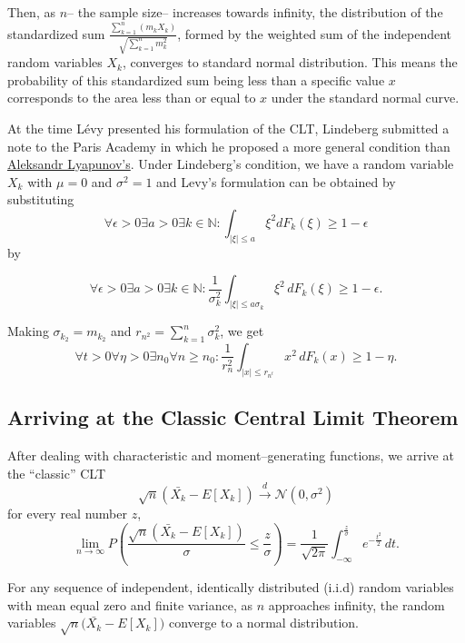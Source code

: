 \documentclass[11.5pt,article,oneside]{article}
\begin{document}
Then, as ${n}$– the sample size– increases towards infinity, the distribution of the standardized sum {\small {$\frac{\sum_{k=1}^{n} (m_k X_k)}{\sqrt{\sum_{k=1}^{n} m_k^{2}}}$}}, formed by the weighted sum of the independent random variables $X_{k}$, converges to standard normal distribution. This means the probability of this standardized sum being less than a specific value ${x}$ corresponds to the area less than or equal to ${x}$ under the standard normal curve.

At the time Lévy presented his formulation of the CLT, Lindeberg submitted a note to the Paris Academy in which he proposed a more general condition than \href{https://en.wikipedia.org/wiki/Aleksandr_Lyapunov}{Aleksandr Lyapunov's}. Under Lindeberg's condition, we have a random variable $X_{k}$ with $\mu = 0$ and $\sigma^{2}= 1$ and Levy's formulation can be obtained by substituting 
\small \[\forall{\epsilon} > {0}\exists{a} > {0}\exists{k} \in {\mathbb{N}: \int_{|\xi| \leq {a}}} \xi^{2}{dF_k(\xi) \geq 1 - \epsilon}
\]
by

\[\forall \epsilon > 0\exists a > 0\exists k \in \mathbb{N}: \frac{1}{\sigma_k^2} \int_{|\xi| \leq a\sigma_{k}} \xi^{2} \, dF_k(\xi) \geq 1 - \epsilon.\] \vspace{.3em}

\noindent Making $\sigma_{k_2} = m_{k_2}$ and  $r_{n^2} = \sum_{k=1}^{n}{\sigma_k^2}$, we get \vspace{.3em}
\[\forall t > 0\forall \eta > 0\exists n_0\forall n \geq n_0: \frac{1}{r_n^2} \int_{|x| \leq r_{n^t}} x^{2} \, dF_k(x) \geq 1 - \eta.\]

\medskip

\subsection*{\color{NavyBlue}Arriving at the Classic Central Limit Theorem} 
\normalsize After dealing with characteristic and moment–generating functions, we arrive at the “classic” CLT 
\small \[\sqrt{n}({\bar{X_k} - E[X_k]}) \stackrel{d}{\rightarrow} \mathcal{N}(0,\sigma^{2})
\]
for every real number $z$,
\[\lim_{{n \to \infty}} P\left(\frac{\sqrt{n} ({\bar{X_k} - E[X_k]})}{\sigma} \leq \frac{z}{\sigma}\right) = \frac{1}{\sqrt{2\pi}} \int_{-\infty}^{\frac{z}{\sigma}}  e^{-\frac{t^2}{2}} \, dt.\]

\normalsize For any sequence of independent, identically distributed (i.i.d) random variables with mean equal zero and finite variance, as $n$ approaches infinity, the random variables $\sqrt{n}({\bar{X_k} - E[X_k])}$ converge to a normal distribution. 
\newpage
\end{document}
